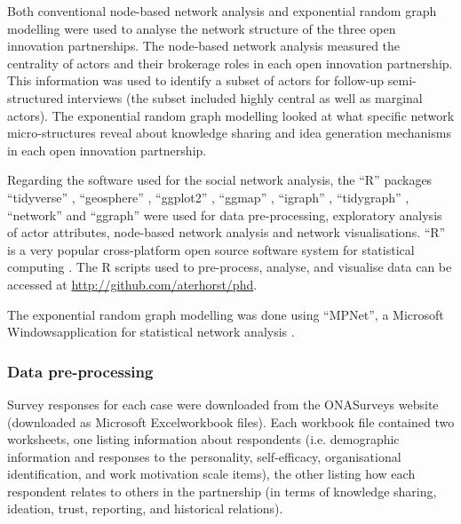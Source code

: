 Both conventional node-based network analysis and exponential random graph modelling were used to analyse the network structure of the three open innovation partnerships. The node-based network analysis measured the centrality of actors and their brokerage roles in each open innovation partnership. This information was used to identify a subset of actors for follow-up semi-structured interviews (the subset included highly central as well as marginal actors). The exponential random graph modelling looked at what specific network micro-structures reveal about knowledge sharing and idea generation mechanisms in each open innovation partnership. \medskip 

Regarding the software used for the social network analysis, the \enquote{R} packages \enquote{tidyverse} \citep{wickham2017tidyverse}, \enquote{geosphere} \citep{hijmans2017geosphere}, \enquote{ggplot2} \citep{wickham2016ggplot2}, \enquote{ggmap} \citep{kahle2013ggmap}, \enquote{igraph} \citep{csardi2006igraph}, \enquote{tidygraph} \citep{pedersen2018tidygraph}, \enquote{network} \citep{butts2008network} and \enquote{ggraph} \citep{pedersen2018ggraph} were used for data pre-processing, exploratory analysis of actor attributes, node-based network analysis and network visualisations. \enquote{R} is a very popular cross-platform open source software system for statistical computing \citep{core2018r}. The R scripts used to pre-process, analyse, and visualise data can be accessed at \url{http://github.com/aterhorst/phd}.  

The exponential random graph modelling was done using \enquote{MPNet}, a Microsoft Windows\texttrademark application for statistical network analysis \citep{wang2014mpnet}. \medskip

\subsubsection{Data pre-processing}

Survey responses for each case were downloaded from the ONASurveys website (downloaded as Microsoft Excel\texttrademark workbook files). Each workbook file contained two worksheets, one listing information about respondents (i.e. demographic information and responses to the personality, self-efficacy, organisational identification, and work motivation scale items), the other listing how each respondent relates to others in the partnership (in terms of knowledge sharing, ideation, trust, reporting, and historical relations). \medskip

